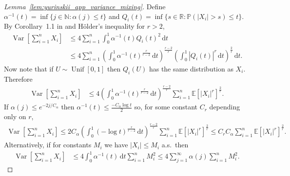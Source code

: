 \documentclass[11pt,lof]{puthesis}
\renewcommand{\P}{\ensuremath{\mathbb{P}}}
\newcommand{\N}{\ensuremath{\mathbb{N}}}
\newcommand{\R}{\ensuremath{\mathbb{R}}}
\newcommand{\E}{\ensuremath{\mathbb{E}}}
\DeclareMathOperator{\Var}{Var}
\DeclareMathOperator{\Unif}{Unif}
\newcommand{\diff}[1]{\,\mathrm{d}#1}
\theoremstyle{break}
\theoremstyle{proof}
\newtheorem{proof}{Proof}
\begin{document}
\begin{proof}[Lemma~\ref{lem:yurinskii_app_variance_mixing}]

  Define
  $\alpha^{-1}(t) =
  \inf\{j \in \N : \alpha(j) \leq t\}$
  and $Q_i(t) = \inf\{s \in \R : \P(|X_i| > s) \leq t\}$.
  By Corollary~1.1 in \citet{rio2017asymptotic}
  and H{\"o}lder's inequality for $r > 2$,
  \begin{align*}
    \Var\left[
      \sum_{i=1}^n X_i
    \right]
    &\leq
    4 \sum_{i=1}^n
    \int_0^1 \alpha^{-1}(t)
    Q_i(t)^2 \diff{t} \\
    &\leq
    4 \sum_{i=1}^n
    \left(
      \int_0^1 \alpha^{-1}(t)^{\frac{r}{r-2}} \diff{t}
    \right)^{\frac{r-2}{r}}
    \left(
      \int_0^1 |Q_i(t)|^r \diff{t}
    \right)^{\frac{2}{r}}
    \diff{t}.
  \end{align*}
  Now note that if $U \sim \Unif[0,1]$ then
  $Q_i(U)$ has the same distribution as $X_i$.
  Therefore
  \begin{align*}
    \Var\left[
      \sum_{i=1}^n X_i
    \right]
    &\leq
    4
    \left(
      \int_0^1 \alpha^{-1}(t)^{\frac r{r-2}} \diff{t}
    \right)^{\frac{r-2}r}
    \sum_{i=1}^n
    \E[|X_i|^r]^{\frac 2 r}.
  \end{align*}
  If $\alpha(j) \leq e^{-2j/C_\alpha}$ then
  $\alpha^{-1}(t) \leq \frac{-C_\alpha \log t}{2}$
  so, for some constant
  $C_r$ depending only on $r$,
  \begin{align*}
    \Var\left[
      \sum_{i=1}^n X_i
    \right]
    \leq
    2 C_\alpha
    \left(
      \int_0^1 (-\log t)^{\frac r{r-2}} \diff{t}
    \right)^{\frac{r-2} r}
    \sum_{i=1}^n
    \E[|X_i|^r]^{\frac 2 r}
    \leq
    C_r C_\alpha
    \sum_{i=1}^n
    \E[|X_i|^r]^{\frac 2 r}.
  \end{align*}
  Alternatively, if for constants $M_i$ we have
  $|X_i| \leq M_i$ a.s.\ then
  \begin{align*}
    \Var\left[
      \sum_{i=1}^n X_i
    \right]
    &\leq
    4 \int_0^1 \alpha^{-1}(t)
    \diff{t}
    \sum_{i=1}^n M_i^2
    \leq
    4 \sum_{j=1}^\infty \alpha(j)
    \sum_{i=1}^n M_i^2.
  \end{align*}
\end{proof}
\end{document}
